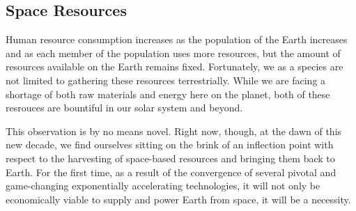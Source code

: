 \documentclass[letter,11pt]{article}
\begin{document}

\subsection{Space Resources}
Human resource consumption increases as the population of the Earth
increases and as each member of the population uses more resources,
but the amount of resources available on the Earth remains fixed.
Fortunately, we as a species are not limited to gathering these resources
terrestrially. While we are facing a shortage of both raw materials\cite{gordon}
and energy\cite{Seboldt2004} here on the planet, both of these resrouces are bountiful
in our solar system and beyond.

This observation is by no means novel. Right now, though, at the dawn
of this new decade, we find ourselves sitting on the brink of an inflection
point with respect to the harvesting of space-based resources and
bringing them back to Earth. For the first time, as a result of the
convergence of several pivotal and game-changing exponentially accelerating
technologies, it will not only be economically viable to supply and
power Earth from space, it will be a necessity.
\end{document}
